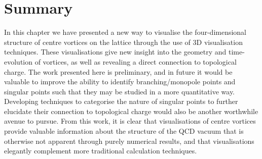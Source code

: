 \section{Summary}
In this chapter we have presented a new way to visualise the four-dimensional structure of centre vortices on the lattice through the use of 3D visualisation techniques. These visualisations give new insight into the geometry and time-evolution of vortices, as well as revealing a direct connection to topological charge. The work presented here is preliminary, and in future it would be valuable to improve the ability to identify branching/monopole points and singular points such that they may be studied in a more quantitative way. Developing techniques to categorise the nature of singular points to further elucidate their connection to topological charge would also be another worthwhile avenue to pursue. From this work, it is clear that visualisations of centre vortices provide valuable information about the structure of the QCD vacuum that is otherwise not apparent through purely numerical results, and that visualisations elegantly complement more traditional calculation techniques.
